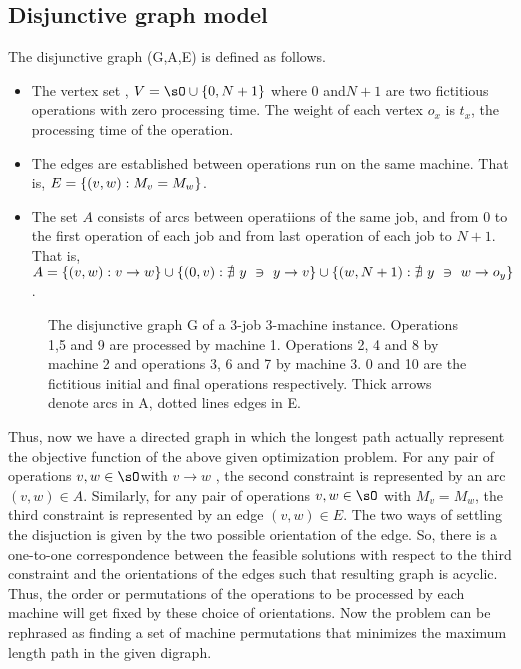 \documentclass[letterpaper,english,10pt]{article}
\begin{document}
\subsection{Disjunctive graph model}
The disjunctive graph (G,A,E) is defined as follows.
\begin{itemize}
\item The vertex set , $V = \sO \cup \set{0,N+1}$ where $0$ and$N+1$ are two fictitious operations with zero processing time. The weight of each vertex $o_x$ is $t_x$, the processing time of the operation.
\item The edges are established between operations run on the same machine.
That is, $E = \left\{(v,w):M_v = M_w\right\}$.
\item The set $A$ consists of arcs between operatiions of the same job, and from $0$ to the first operation of each job and from last operation of each job to $N+1$. That is, $A = \left\{(v,w): v \rightarrow w \right\} \cup \left\{(0,v): \nexists~ y ~\ni~ y \rightarrow v\right\} \cup \left\{(w,N+1) :\nexists~ y ~\ni~ w \rightarrow o_y\right\}$.
\end{itemize}
\begin{figure}[t]
  \begin{center}
  \scalebox{0.75}{}
  \end{center}
  \caption{The disjunctive graph G of a 3-job 3-machine instance. Operations 1,5 and 9 are processed by machine 1. Operations 2, 4 and 8 by machine 2 and operations 3, 6 and 7 by machine 3. 0 and 10 are the fictitious initial and final operations respectively. Thick arrows denote arcs in A, dotted lines edges in E.}
  \label{figure:Instance}
\end{figure}
Thus, now we have a directed graph in which the longest path actually represent the objective function of the above given optimization problem. 
For any pair of operations $v,w \in \sO$with $v \rightarrow w$ , the second constraint is represented by an arc $(v,w) \in A$.
Similarly, for any pair of operations $v,w \in \sO$ with $M_v = M_w$, the third constraint is represented by an edge $(v,w) \in E$.
The two ways of settling the disjuction is given by the two possible orientation of the edge. 
So, there is a one-to-one correspondence between the feasible solutions with respect to the third constraint and the orientations of the edges such that resulting graph is acyclic. 
Thus, the order or permutations of the operations to be processed by each machine will get fixed by these choice of orientations.
Now the problem can be rephrased as finding a set of machine permutations that minimizes the maximum length path in the given digraph.
\end{document}
